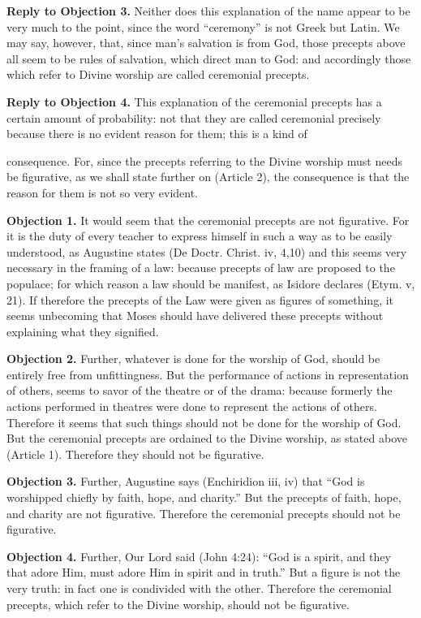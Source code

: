 \textbf{Reply to Objection 3.} Neither does this explanation of the name appear to be very much to the point, since the word ``ceremony'' is not Greek but Latin. We may say, however, that, since man's salvation is from God, those precepts above all seem to be rules of salvation, which direct man to God: and accordingly those which refer to Divine worship are called ceremonial precepts.

\textbf{Reply to Objection 4.} This explanation of the ceremonial precepts has a certain amount of probability: not that they are called ceremonial precisely because there is no evident reason for them; this is a kind of

consequence. For, since the precepts referring to the Divine worship must needs be figurative, as we shall state further on (Article 2), the consequence is that the reason for them is not so very evident.


\textbf{Objection 1.} It would seem that the ceremonial precepts are not figurative. For it is the duty of every teacher to express himself in such a way as to be easily understood, as Augustine states (De Doctr. Christ. iv, 4,10) and this seems very necessary in the framing of a law: because precepts of law are proposed to the populace; for which reason a law should be manifest, as Isidore declares (Etym. v, 21). If therefore the precepts of the Law were given as figures of something, it seems unbecoming that Moses should have delivered these precepts without explaining what they signified.

\textbf{Objection 2.} Further, whatever is done for the worship of God, should be entirely free from unfittingness. But the performance of actions in representation of others, seems to savor of the theatre or of the drama: because formerly the actions performed in theatres were done to represent the actions of others. Therefore it seems that such things should not be done for the worship of God. But the ceremonial precepts are ordained to the Divine worship, as stated above (Article 1). Therefore they should not be figurative.

\textbf{Objection 3.} Further, Augustine says (Enchiridion iii, iv) that ``God is worshipped chiefly by faith, hope, and charity.'' But the precepts of faith, hope, and charity are not figurative. Therefore the ceremonial precepts should not be figurative.

\textbf{Objection 4.} Further, Our Lord said (John 4:24): ``God is a spirit, and they that adore Him, must adore Him in spirit and in truth.'' But a figure is not the very truth: in fact one is condivided with the other. Therefore the ceremonial precepts, which refer to the Divine worship, should not be figurative.

